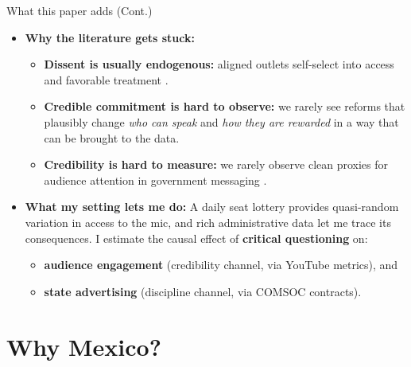 \documentclass[10pt,aspectratio=169]{beamer}
\begin{document}
\begin{frame}{What this paper adds (Cont.)}
\begin{itemize}\setlength\itemsep{0.85em}

\item \textbf{Why the literature gets stuck:}
  \begin{itemize}\setlength\itemsep{0.25em}
    \item \textbf{Dissent is usually endogenous:} aligned outlets self-select into access and favorable treatment
    {\footnotesize\color{gray}\citep{ArgCorr-DiTella-AEJAE}}.
    \item \textbf{Credible commitment is hard to observe:} we rarely see reforms that plausibly change
    \textit{who can speak} and \textit{how they are rewarded} in a way that can be brought to the data.
    \item \textbf{Credibility is hard to measure:} we rarely observe clean proxies for audience attention in government messaging
    {\footnotesize\color{gray}\citep{PersuasionEmpirical-Dellavigna-AR}}.
  \end{itemize}
  
  \item \textbf{What my setting lets me do:}
  A daily seat lottery provides quasi-random variation in \alert{access to the mic},
  and rich administrative data let me trace its consequences. I estimate the causal effect of \textbf{critical questioning} on:
  \begin{itemize}\setlength\itemsep{0.25em}
    \item \textbf{audience engagement} (credibility channel, via YouTube metrics), and
    \item \textbf{state advertising} (discipline channel, via COMSOC contracts).
  \end{itemize}
\end{itemize}




\end{frame}


\section{Why Mexico?}
\end{document}

